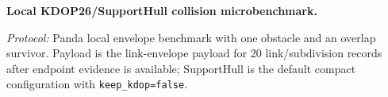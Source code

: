 \begin{center}
\noindent\begin{minipage}{\columnwidth}
\textbf{Local KDOP26/SupportHull collision microbenchmark.}
\vspace{2pt}

\scriptsize
\setlength{\tabcolsep}{3pt}
\vspace{1pt}
\parbox{0.96\columnwidth}{\scriptsize\emph{Protocol:} Panda local envelope benchmark with one obstacle and an overlap survivor. Payload is the link-envelope payload for 20 link/subdivision records after endpoint evidence is available; SupportHull is the default compact configuration with \texttt{keep\_kdop=false}.}
\end{minipage}
\end{center}
